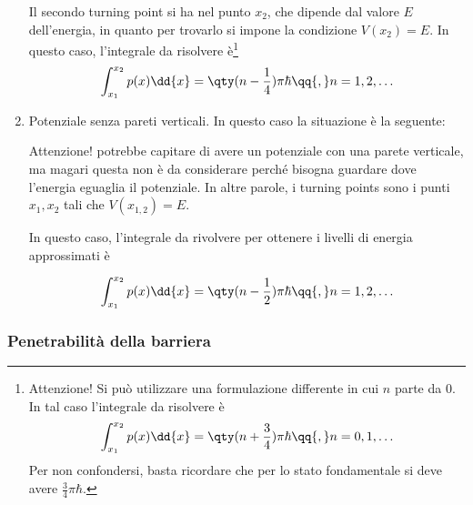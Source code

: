 \begin{enumerate}[leftmargin=0.6cm]
   Il secondo turning point si ha nel punto $x_2$, che dipende dal valore $E$ dell'energia, in quanto per trovarlo si impone la condizione $V(x_2)=E$. In questo caso, l'integrale da risolvere è\footnote{Attenzione! Si può utilizzare una formulazione differente in cui $n$ parte da $0$. In tal caso l'integrale da risolvere è
   \begin{equation*}
      \int_{x_1}^{x_2} p(x) \dd{x}=\qty( n + \frac{3}{4} )\pi\hbar
      \qq{,}
      n=0,1,\ldots
   \end{equation*}
   Per non confondersi, basta ricordare che per lo stato fondamentale si deve avere $\frac{3}{4}\pi\hbar$.}
   \begin{equation*}
      \int_{x_1}^{x_2} p(x) \dd{x}=\qty( n - \frac{1}{4} )\pi\hbar
      \qq{,}
      n=1,2,\ldots
   \end{equation*}
   
   \item Potenziale senza pareti verticali.
   In questo caso la situazione è la seguente:
   
   \begin{figure}[H]
      \centering
   \end{figure}

   Attenzione! potrebbe capitare di avere un potenziale con una parete verticale, ma magari questa non è da considerare perché bisogna guardare dove l'energia eguaglia il potenziale. In altre parole, i turning points sono i punti $x_1, x_2$ tali che $V(x_{1,2})=E$.
   
   In questo caso, l'integrale da rivolvere per ottenere i livelli di energia approssimati è

   \begin{equation*}
      \int_{x_1}^{x_2} p(x) \dd{x}=\qty( n - \frac{1}{2} )\pi\hbar
      \qq{,}
      n=1,2,\ldots
   \end{equation*}

\end{enumerate}


\subsubsection*{Penetrabilità della barriera}

